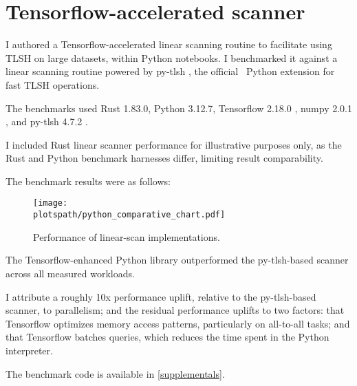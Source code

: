 \documentclass[5p,final]{elsarticle}
\newcommand{\plotspath}{paper-dependencies/latex-dependencies/plots}
\begin{document}
\section{Tensorflow-accelerated scanner}\label{Python}

I authored a Tensorflow-accelerated linear scanning routine to
facilitate using TLSH on large datasets, within Python notebooks. I
benchmarked it against a linear scanning routine powered by py-tlsh
\cite{PytlshTLSHPython2024}, the official \cpluspluslogo\, Python
extension for fast TLSH operations.

The benchmarks used Rust 1.83.0, Python 3.12.7, Tensorflow 2.18.0
\cite{martinabadiTensorFlowLargeScaleMachine2015}, numpy 2.0.1
\cite{harris2020array}, and py-tlsh 4.7.2 \cite{PytlshTLSHPython2024}.

I included Rust linear scanner performance for illustrative purposes
only, as the Rust and Python benchmark harnesses differ, limiting
result comparability.

The benchmark results were as follows:

\begin{figure}[H]
	\centering
	\texttt{[image: \\plotspath/python\_comparative\_chart.pdf]}
	\caption{Performance of linear-scan implementations.}
	\label{fig:python_linear_scan}
\end{figure}

The Tensorflow-enhanced Python library outperformed the py-tlsh-based scanner
across all measured workloads.

I attribute a roughly 10x
performance uplift, relative to the py-tlsh-based scanner, to
parallelism; and the residual performance uplifts to two factors:
that Tensorflow
optimizes memory access patterns, particularly on all-to-all tasks;
and that Tensorflow batches queries, which reduces the time spent in the Python
interpreter.

The benchmark code is available in \ref{supplementals}.
\end{document}
